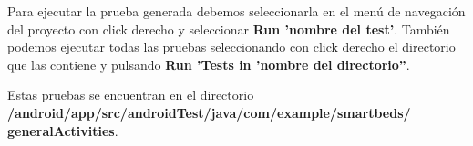 Para ejecutar la prueba generada debemos seleccionarla en el menú de navegación del proyecto con click derecho y seleccionar \textbf{Run 'nombre del test'}. También podemos ejecutar todas las pruebas seleccionando con click derecho el directorio que las contiene y pulsando \textbf{Run 'Tests in 'nombre del directorio''}. 

Estas pruebas se encuentran en el directorio \\ \textbf{/android/app/src/androidTest/java/com/example/smartbeds/\\generalActivities}.

